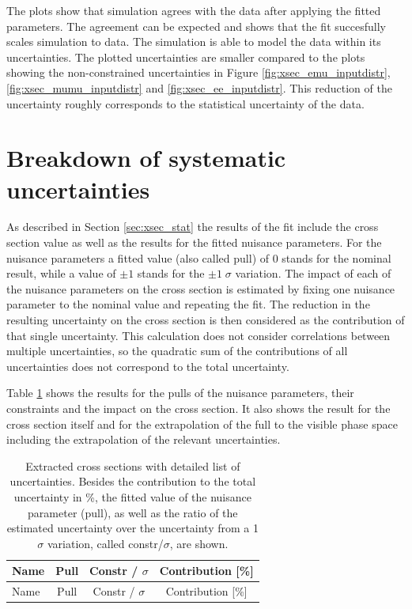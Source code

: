 The plots show that simulation agrees with the data after applying the fitted parameters.
The agreement can be expected and shows that the fit succesfully scales simulation to data.
The simulation is able to model the data within its uncertainties.
The plotted uncertainties are smaller compared to the plots showing the non-constrained uncertainties in Figure \ref{fig:xsec_emu_inputdistr},\ref{fig:xsec_mumu_inputdistr} and \ref{fig:xsec_ee_inputdistr}.
This reduction of the uncertainty roughly corresponds to the statistical uncertainty of the data.



\section{Breakdown of systematic uncertainties}
\label{sec:results_uncert}

As described in Section \ref{sec:xsec_stat} the results of the fit include the \ttbar cross section value as well as the results for the fitted nuisance parameters.
For the nuisance parameters a fitted value (also called pull) of $0$ stands for the nominal result, while a value of $\pm 1$ stands for the $\pm 1 \; \sigma$ variation.
The impact of each of the nuisance parameters on the cross section is estimated by fixing one nuisance parameter to the nominal value and repeating the fit.
The reduction in the resulting uncertainty on the cross section is then considered as the contribution of that single uncertainty. This calculation does not consider correlations between multiple uncertainties,
so the quadratic sum of the contributions of all uncertainties does not correspond to the total uncertainty.

Table \ref{tab:lh_res_eightfull} shows the results for the pulls of the nuisance parameters, their constraints and the impact on the cross section.
It also shows the result for the cross section itself and for the extrapolation of the full to the visible phase space including the extrapolation of the relevant uncertainties.

\begin{longtable}{ l | c | c | c }%
\caption{Extracted cross sections with detailed
  list of uncertainties. Besides the contribution to the total
  uncertainty in \%, the fitted value of the nuisance parameter (pull), as well as the ratio of the estimated
  uncertainty over the uncertainty from a 1 $\sigma$ variation, called
  constr/$\sigma$, are shown. 
  \label{tab:lh_res_eightfull}}\\
\hline
Name & Pull & Constr / $\sigma$ & Contribution [\%] \\ 
\hline
\endfirsthead
\hline
Name & Pull & Constr / $\sigma$ & Contribution [\%] \\ 
\hline
\endhead

\end{longtable}

